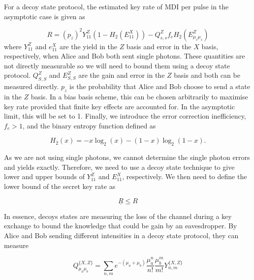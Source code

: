 For a decoy state protocol, the estimated key rate of \ac{MDI} per pulse in the asymptotic case is given as \cite{Lo2014}

\begin{equation}
	R = (p_z)^2 Y_{11}^Z \left(1 - H_2(E_{11}^X)\right) - Q_{s,s}^Z f_e H_2(E_{\mu_s\mu_s}^Z)
\end{equation}
where $Y_{11}^Z$ and $e_{11}^X$ are the yield in the $Z$ basis and error in the $X$ basis, respectively, when Alice and Bob both sent single photons. These quantities are not directly measurable so we will need to bound them using a decoy state protocol. $Q_{S,S}^Z$ and $E_{S,S}^Z$ are the gain and error in the $Z$ basis and both can be measured directly. $p_z$  is the probability that Alice and Bob choose to send a state in the $Z$ basis. In a bias basis scheme, this can be chosen arbitrarily to maximise key rate provided that finite key effects are accounted for. In the asymptotic limit, this will be set to 1. Finally, we introduce the error correction inefficiency, $f_e>1$, and the binary entropy function defined as

\begin{equation}
	H_2(x) = -x \log_2(x) - (1-x) \log_2(1-x).
\end{equation}


As we are not using single photons, we cannot determine the single photon errors and yields exactly. Therefore, we need to use a decoy state technique \cite{Lo2005} to give lower and upper bounds of $Y_{11}^Z$ and $E_{11}^X$, respectively. We then need to define the lower bound of the secret key rate as

\begin{equation}
	\underline{R} \leq R
\end{equation}

In essence, decoys states are measuring the loss of the channel during a key exchange to bound the knowledge that could be gain by an eavesdropper.  By Alice and Bob sending different intensities in a decoy state protocol, they can measure

\begin{equation}
	Q^{\{X, Z\}}_{\mu_a \mu_b} = \sum_{n,m} e^{-(\mu_a + \mu_b)}\frac{\mu_a^n}{n!}\frac{\mu_b^m}{m!} Y_{n,m}^{\{X, Z\}}
\end{equation}

